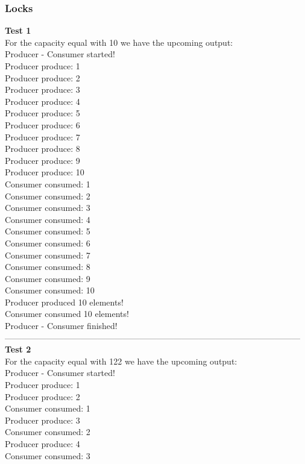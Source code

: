 \documentclass[14pt]{article}
\begin{document}
\subsubsection{Locks}
\textbf{Test 1}
\\For the capacity equal with 10 we have the upcoming output:
\\Producer - Consumer started!
\\Producer produce: 1
\\Producer produce: 2
\\Producer produce: 3
\\Producer produce: 4
\\Producer produce: 5
\\Producer produce: 6
\\Producer produce: 7
\\Producer produce: 8
\\Producer produce: 9
\\Producer produce: 10
\\Consumer consumed: 1
\\Consumer consumed: 2
\\Consumer consumed: 3
\\Consumer consumed: 4
\\Consumer consumed: 5
\\Consumer consumed: 6
\\Consumer consumed: 7
\\Consumer consumed: 8
\\Consumer consumed: 9
\\Consumer consumed: 10
\\Producer produced 10 elements!
\\Consumer consumed 10 elements!
\\Producer - Consumer finished!
\\---------------------------------------------------------------------------------------------------------
\\\textbf{Test 2}
\\For the capacity equal with 122 we have the upcoming output:
\\Producer - Consumer started!
\\Producer produce: 1
\\Producer produce: 2
\\Consumer consumed: 1
\\Producer produce: 3
\\Consumer consumed: 2
\\Producer produce: 4
\\Consumer consumed: 3
\end{document}
